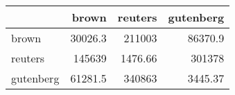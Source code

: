 \begin{tabular}{lrrr}
\hline
           &    brown &   reuters &   gutenberg \\
\hline
 brown     &  30026.3 & 211003    &    86370.9  \\
 reuters   & 145639   &   1476.66 &   301378    \\
 gutenberg &  61281.5 & 340863    &     3445.37 \\
\hline
\end{tabular}
